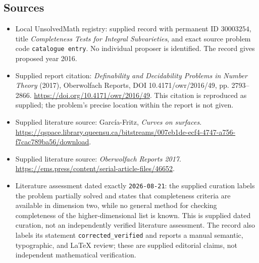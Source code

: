 \documentclass[11pt]{article}
\begin{document}
\subsection{Sources}
\begin{itemize}
\item Local UnsolvedMath registry: supplied record with permanent ID \(30003254\), title \emph{Completeness Tests for Integral Subvarieties}, and exact source problem code \texttt{catalogue entry}. No individual proposer is identified. The record gives proposed year 2016.
\item Supplied report citation: \emph{Definability and Decidability Problems in Number Theory} (2017), Oberwolfach Reports, DOI 10.4171/owr/2016/49, pp. 2793--2866. \url{https://doi.org/10.4171/owr/2016/49}. This citation is reproduced as supplied; the problem's precise location within the report is not given.
\item Supplied literature source: Garc\'{i}a-Fritz, \emph{Curves on surfaces}. \url{https://qspace.library.queensu.ca/bitstreams/007eb1de-ecf4-4747-a756-f7cac789ba56/download}.
\item Supplied literature source: \emph{Oberwolfach Reports 2017}. \url{https://ems.press/content/serial-article-files/46652}.
\item Literature assessment dated exactly \texttt{2026-08-21}: the supplied curation labels the problem partially solved and states that completeness criteria are available in dimension two, while no general method for checking completeness of the higher-dimensional list is known. This is supplied dated curation, not an independently verified literature assessment. The record also labels its statement \texttt{corrected\_verified} and reports a manual semantic, typographic, and LaTeX review; these are supplied editorial claims, not independent mathematical verification.
\end{itemize}
\end{document}
